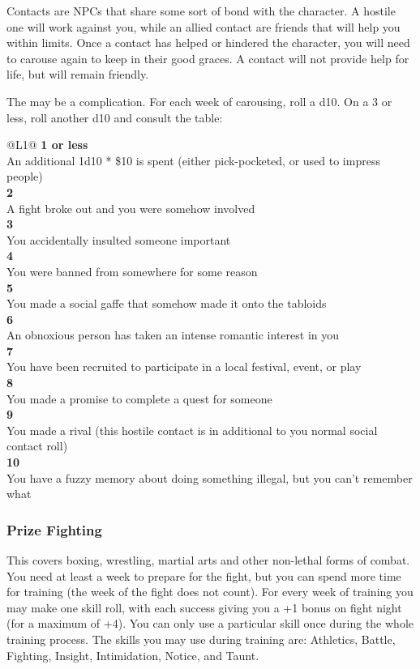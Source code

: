 Contacts are NPCs that share some sort of bond with the character. A hostile one will work against you, while an allied contact are friends that will help you within limits. Once a contact has helped or hindered the character, you will need to carouse again to keep in their good graces. A contact will not provide help for life, but will remain friendly.

The may be a complication. For each week of carousing, roll a d10. On a 3 or less, roll another d10 and consult the table:

\begin{redtable}{\linewidth}{@{}L{1}@{}}
\textbf{1 or less}\\
An additional 1d10 * \$10 is spent (either pick-pocketed, or used to impress people)\\
\textbf{2}\\
A fight broke out and you were somehow involved\\
\textbf{3}\\
You accidentally insulted someone important\\
\textbf{4}\\
You were banned from somewhere for some reason\\
\textbf{5}\\
You made a social gaffe that somehow made it onto the tabloids\\
\textbf{6}\\
An obnoxious person has taken an intense romantic interest in you\\
\textbf{7}\\
You have been recruited to participate in a local festival, event, or play\\
\textbf{8}\\
You made a promise to complete a quest for someone\\
\textbf{9}\\
You made a rival (this hostile contact is in additional to you normal social contact roll)\\
\textbf{10}\\
You have a fuzzy memory about doing something illegal, but you can't remember what\\
\end{redtable}

\subsubsection{Prize Fighting}

This covers boxing, wrestling, martial arts and other non-lethal forms of combat. You need at least a week to prepare for the fight, but you can spend more time for training (the week of the fight does not count). For every week of training you may make one skill roll, with each success giving you a +1 bonus on fight night (for a maximum of +4). You can only use a particular skill once during the whole training process. The skills you may use during training are: Athletics, Battle, Fighting, Insight, Intimidation, Notice, and Taunt.

